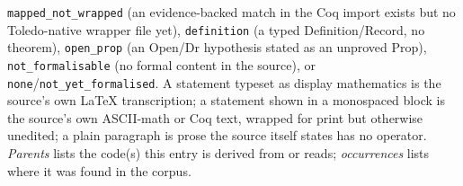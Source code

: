 \documentclass[10pt,a4paper]{article}
\begin{document}
\begin{titlepage}
\begin{minipage}{0.86\textwidth}
\texttt{mapped\_not\_wrapped} (an evidence-backed match in the Coq import exists
but no Toledo-native wrapper file yet), \texttt{definition} (a typed
Definition/Record, no theorem), \texttt{open\_prop} (an Open/Dr hypothesis stated
as an unproved Prop), \texttt{not\_formalisable} (no formal content in the
source), or \texttt{none}/\texttt{not\_yet\_formalised}. A statement typeset as
display mathematics is the source's own LaTeX transcription; a statement shown in
a monospaced block is the source's own ASCII-math or Coq text, wrapped for print
but otherwise unedited; a plain paragraph is prose the source itself states has no
operator. \emph{Parents} lists the code(s) this entry is derived from or reads;
\emph{occurrences} lists where it was found in the corpus.
\end{minipage}
\vspace{1cm}
\end{titlepage}

\clearpage
\tableofcontents
\clearpage


\end{document}
